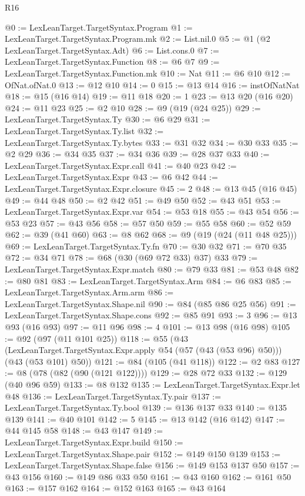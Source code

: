 \begin{lexlean}{R16}
\begin{coremodule}
@0 := LexLeanTarget.TargetSyntax.Program
@1 := LexLeanTarget.TargetSyntax.Program.mk
@2 := List.nil.{0}
@5 := @1 (@2 LexLeanTarget.TargetSyntax.Adt)
@6 := List.cons.{0}
@7 := LexLeanTarget.TargetSyntax.Function
@8 := @6 @7
@9 := LexLeanTarget.TargetSyntax.Function.mk
@10 := Nat
@11 := @6 @10
@12 := OfNat.ofNat.{0}
@13 := @12 @10
@14 := 0
@15 := @13 @14
@16 := instOfNatNat
@18 := @15 (@16 @14)
@19 := @11 @18
@20 := 1
@23 := @13 @20 (@16 @20)
@24 := @11 @23
@25 := @2 @10
@28 := @9 (@19 (@24 @25))
@29 := LexLeanTarget.TargetSyntax.Ty
@30 := @6 @29
@31 := LexLeanTarget.TargetSyntax.Ty.list
@32 := LexLeanTarget.TargetSyntax.Ty.bytes
@33 := @31 @32
@34 := @30 @33
@35 := @2 @29
@36 := @34 @35
@37 := @34 @36
@39 := @28 @37 @33
@40 := LexLeanTarget.TargetSyntax.Expr.call
@41 := @40 @23
@42 := LexLeanTarget.TargetSyntax.Expr
@43 := @6 @42
@44 := LexLeanTarget.TargetSyntax.Expr.closure
@45 := 2
@48 := @13 @45 (@16 @45)
@49 := @44 @48
@50 := @2 @42
@51 := @49 @50
@52 := @43 @51
@53 := LexLeanTarget.TargetSyntax.Expr.var
@54 := @53 @18
@55 := @43 @54
@56 := @53 @23
@57 := @43 @56
@58 := @57 @50
@59 := @55 @58
@60 := @52 @59
@62 := @39 (@41 @60)
@63 := @8 @62
@68 := @9 (@19 (@24 (@11 @48 @25)))
@69 := LexLeanTarget.TargetSyntax.Ty.fn
@70 := @30 @32
@71 := @70 @35
@72 := @34 @71
@78 := @68 (@30 (@69 @72 @33) @37) @33
@79 := LexLeanTarget.TargetSyntax.Expr.match
@80 := @79 @33
@81 := @53 @48
@82 := @80 @81
@83 := LexLeanTarget.TargetSyntax.Arm
@84 := @6 @83
@85 := LexLeanTarget.TargetSyntax.Arm.arm
@86 := LexLeanTarget.TargetSyntax.Shape.nil
@90 := @84 (@85 @86 @25 @56)
@91 := LexLeanTarget.TargetSyntax.Shape.cons
@92 := @85 @91
@93 := 3
@96 := @13 @93 (@16 @93)
@97 := @11 @96
@98 := 4
@101 := @13 @98 (@16 @98)
@105 := @92 (@97 (@11 @101 @25))
@118 := @55
    (@43 (LexLeanTarget.TargetSyntax.Expr.apply @54 (@57 (@43 (@53 @96) @50))) (@43 (@53 @101) @50))
@121 := @84 (@105 (@41 @118))
@122 := @2 @83
@127 := @8 (@78 (@82 (@90 (@121 @122))))
@129 := @28 @72 @33
@132 := @129 (@40 @96 @59)
@133 := @8 @132
@135 := LexLeanTarget.TargetSyntax.Expr.let @48
@136 := LexLeanTarget.TargetSyntax.Ty.pair
@137 := LexLeanTarget.TargetSyntax.Ty.bool
@139 := @136 @137 @33
@140 := @135 @139
@141 := @40 @101
@142 := 5
@145 := @13 @142 (@16 @142)
@147 := @44 @145 @58
@148 := @43 @147
@149 := LexLeanTarget.TargetSyntax.Expr.build
@150 := LexLeanTarget.TargetSyntax.Shape.pair
@152 := @149 @150 @139
@153 := LexLeanTarget.TargetSyntax.Shape.false
@156 := @149 @153 @137 @50
@157 := @43 @156
@160 := @149 @86 @33 @50
@161 := @43 @160
@162 := @161 @50
@163 := @157 @162
@164 := @152 @163
@165 := @43 @164

\end{coremodule}
\end{lexlean}
